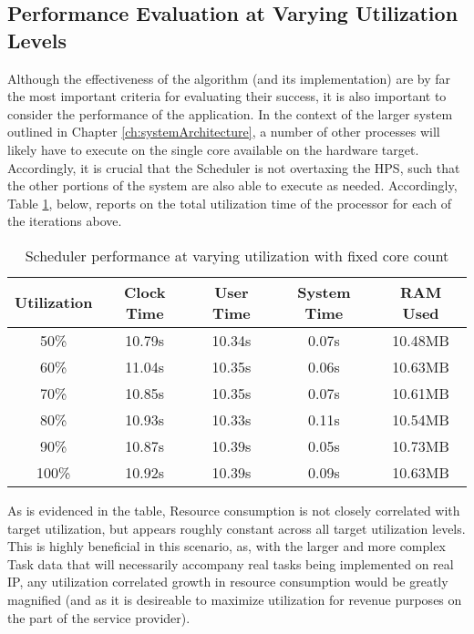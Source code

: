 \subsection{Performance Evaluation at Varying Utilization Levels}\label{subsec:performanceDataUtilVary}
Although the effectiveness of the algorithm (and its implementation) are by far the most important criteria for evaluating their success, it is also important to consider the performance of the application. In the context of the larger system outlined in Chapter \ref{ch:systemArchitecture}, a number of other processes will likely have to execute on the single core available on the hardware target. Accordingly, it is crucial that the Scheduler is not overtaxing the HPS, such that the other portions of the system are also able to execute as needed. Accordingly, Table \ref{table:SchedPerfUtilVary}, below, reports on the total utilization time of the processor for each of the iterations above.

\begin{table}[ht!]
    \centering\begin{tabular}{| c | c | c | c | c |}
        \hline
        Utilization & Clock Time & User Time & System Time & RAM Used \\
        \hline
        50\% & 10.79s & 10.34s & 0.07s & 10.48MB \\
        60\% & 11.04s & 10.35s & 0.06s & 10.63MB \\
        70\% & 10.85s & 10.35s & 0.07s & 10.61MB \\
        80\% & 10.93s & 10.33s & 0.11s & 10.54MB \\
        90\% & 10.87s & 10.39s & 0.05s & 10.73MB \\
        100\% & 10.92s & 10.39s & 0.09s & 10.63MB \\
        \hline
    \end{tabular}
    \caption{Scheduler performance at varying utilization with fixed core count}
    \label{table:SchedPerfUtilVary}
\end{table}

As is evidenced in the table, Resource consumption is not closely correlated with target utilization, but appears roughly constant across all target utilization levels. This is highly beneficial in this scenario, as, with the larger and more complex Task data that will necessarily accompany real tasks being implemented on real IP, any utilization correlated growth in resource consumption would be greatly magnified (and as it is desireable to maximize utilization for revenue purposes on the part of the service provider). 

